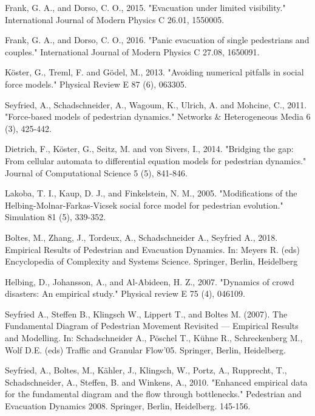 \documentclass[preprint,12pt]{elsarticle}
\begin{document}
\begin{thebibliography}{10}
Frank, G. A., and Dorso, C. O., 2015. "Evacuation under limited 
visibility." International Journal of Modern Physics C 26.01, 1550005.
{}

Frank, G. A., and Dorso, C. O., 2016. "Panic evacuation of single pedestrians 
and couples." International Journal of Modern Physics C 27.08, 1650091. 
{}

K\"oster, G., Treml, F. and G\"odel, M., 2013. "Avoiding 
numerical pitfalls in social force models." Physical Review E 87 (6), 063305.
{}

Seyfried, A., Schadschneider, A., Wagoum, K., Ulrich, A. and Mohcine, C., 
2011. "Force-based models of pedestrian dynamics." Networks 
\& Heterogeneous Media 6 (3), 425-442.
{}

Dietrich, F., K\"oster, G., Seitz, M. and 
von Sivers, I., 2014. "Bridging the gap: From cellular automata to 
differential equation models for pedestrian dynamics." Journal of Computational 
Science 5 (5), 841-846.{}

Lakoba, T. I., Kaup, D. J., and Finkelstein, N. M., 2005. "Modifications of the 
Helbing-Molnar-Farkas-Vicsek social force model for pedestrian evolution." 
Simulation 81 (5), 339-352.
{}

Boltes, M., Zhang, J., Tordeux, A., Schadschneider A., Seyfried 
A., 
2018. Empirical Results of Pedestrian and Evacuation Dynamics. In: Meyers R. 
(eds) Encyclopedia of Complexity and Systems Science. Springer, Berlin, 
Heidelberg

Helbing, D., Johansson, A., and Al-Abideen, H. Z., 2007. "Dynamics of crowd 
disasters: An empirical study." Physical review E 75 (4), 046109.
{}

Seyfried A., Steffen B., Klingsch W., Lippert T., and Boltes M. (2007). The 
Fundamental Diagram of Pedestrian Movement Revisited — Empirical Results and 
Modelling. In: Schadschneider A., P\"oschel T., K\"uhne R., Schreckenberg M., 
Wolf D.E. (eds) Traffic and Granular Flow’05. Springer, Berlin, Heidelberg.

Seyfried, A., Boltes, M., K\"ahler, J., Klingsch, W., Portz, A., Rupprecht, 
T., Schadschneider, A., Steffen, B. and Winkens, A., 2010. "Enhanced empirical 
data for the fundamental diagram and the flow through bottlenecks." Pedestrian 
and Evacuation Dynamics 2008. Springer, Berlin, Heidelberg. 145-156.
{}


\end{thebibliography}
\end{document}
